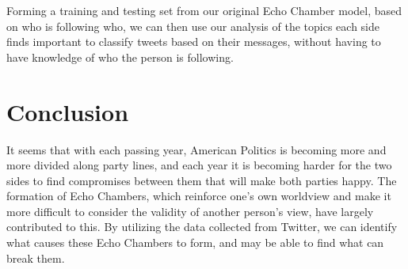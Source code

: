 \documentclass[journal]{IEEEtran}
\begin{document}
	Forming a training and testing set from our original Echo Chamber model, based on who is following who, we can then use our analysis of the topics each side finds important to classify tweets based on their messages, without having to have knowledge of who the person is following. 
	
	
	\section{Conclusion}
	
	It seems that with each passing year, American Politics is becoming more and more divided along party lines, and each year it is becoming harder for the two sides to find compromises between them that will make both parties happy. The formation of Echo Chambers, which reinforce one’s own worldview and make it more difficult to consider the validity of another person’s view, have largely contributed to this. By utilizing the data collected from Twitter, we can identify what causes these Echo Chambers to form, and may be able to find what can break them.
	
	
	

	
\end{document}
